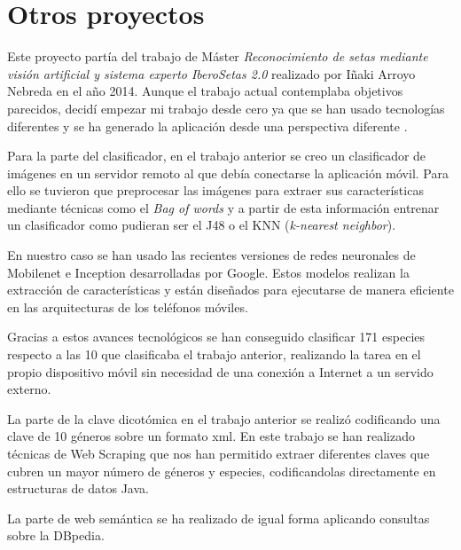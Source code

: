 

\section{Otros proyectos}

Este proyecto partía del trabajo de Máster \textit{Reconocimiento de setas mediante visión artificial y sistema experto IberoSetas 2.0} realizado por Iñaki Arroyo Nebreda en el año 2014. Aunque el trabajo actual contemplaba objetivos parecidos, decidí empezar mi trabajo desde cero ya que se han usado tecnologías diferentes y se ha generado la aplicación desde una perspectiva diferente \cite{iberosetas}.

Para la parte del clasificador, en el trabajo anterior se creo un clasificador de imágenes en un servidor remoto al que debía conectarse la aplicación móvil. Para ello se tuvieron que preprocesar las imágenes para extraer sus características mediante técnicas como el \textit{Bag of words} y a partir de esta información entrenar un clasificador como pudieran ser el J48 o el KNN (\textit{k-nearest neighbor}).

En nuestro caso se han usado las recientes versiones de redes neuronales de Mobilenet e Inception desarrolladas por Google. Estos modelos realizan la extracción de características y están diseñados para ejecutarse de manera eficiente en las arquitecturas de los teléfonos móviles.

Gracias a estos avances tecnológicos se han conseguido clasificar 171 especies respecto a las 10 que clasificaba el trabajo anterior, realizando la tarea en el propio dispositivo móvil sin necesidad de una conexión a Internet a un servido externo.

La parte de la clave dicotómica en el trabajo anterior se realizó codificando una clave de 10 géneros sobre un formato xml. En este trabajo se han realizado técnicas de Web Scraping que nos han permitido extraer diferentes claves que cubren un mayor número de géneros y especies, codificandolas directamente en estructuras de datos Java.

La parte de web semántica se ha realizado de igual forma aplicando consultas sobre la DBpedia.

